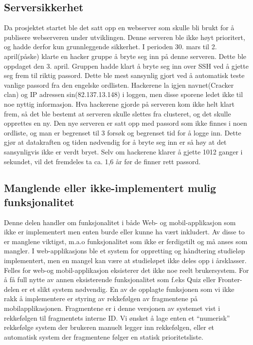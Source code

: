 \documentclass[../main.tex]{subfiles}
\begin{document}
\subsection{Serversikkerhet}

Da prosjektet startet ble det satt opp en webserver som skulle bli brukt for å publisere webserveren under utviklingen. Denne serveren ble ikke høyt prioritert, og hadde derfor kun grunnleggende sikkerhet. \newline
I perioden 30. mars til 2. april(påske) klarte en hacker gruppe å bryte seg inn på denne serveren. Dette ble oppdaget den 3. april. Gruppen hadde klart å bryte seg inn over SSH ved å gjette seg frem til riktig passord. Dette ble mest sansynlig gjort ved å automatisk teste vanlige passord fra den engelske ordlisten. Hackerene la igjen navnet(Cracker clan) og IP adressen sin(82.137.13.148) i loggen, men disse sporene ledet ikke til noe nyttig informasjon. \newline
Hva hackerene gjorde på serveren kom ikke helt klart frem, så det ble bestemt at serveren skulle slettes fra clusteret, og det skulle opprettes en ny. \newline
Den nye serveren er satt opp med passord som ikke finnes i noen ordliste, og man er begrenset til 3 forsøk og begrenset tid for å logge inn. Dette gjør at datakraften og tiden nødvendig for å bryte seg inn er så høy at det sansynligvis ikke er verdt bryet. Selv om hackerene klarer å gjette 1012 ganger i sekundet, vil det fremdeles ta ca. 1,6 år før de finner rett passord.

\subsection{Manglende eller ikke-implementert mulig funksjonalitet}

Denne delen handler om funksjonalitet i både Web- og mobil-applikasjon som ikke er implementert men enten burde eller kunne ha vært inkludert. Av disse to er manglene viktigst, m.a.o funksjonalitet som ikke er ferdigstilt og må anses som mangler. \newline
\newline
I web-applikasjons ble et system for oppretting og håndtering studieløp implementert, men en mangel kan være at studieløpet ikke deles opp i årsklasser. \newline
\newline
Felles for web-og mobil-applikasjon eksisterer det ikke noe reelt brukersystem. For å få full nytte av annen eksisterende funksjonalitet som f.eks Quiz eller Fronter-delen er et slikt system nødvendig.\newline
\newline
En av de opplagte funksjonen som vi ikke rakk å implementere er styring av rekkefølgen av fragmentene på mobilapplikasjonen. Fragmentene er i denne versjonen av systemet vist i rekkefølgen til fragmentets interne ID. Vi ønsket å lage enten et “numerisk” rekkefølge system der brukeren manuelt legger inn rekkefølgen, eller et automatisk system der fragmentene følger en statisk prioritetsliste. 
\end{document}
